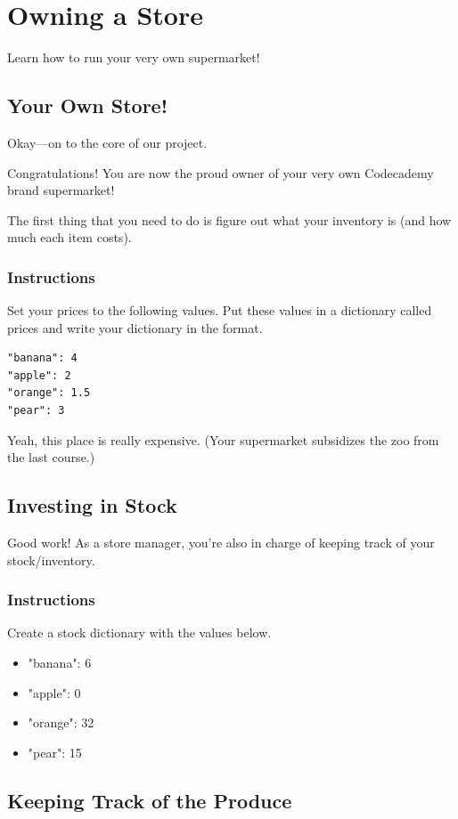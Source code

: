 \documentclass[12pt,a4paper,final,twoside,onecolumn,titlepage]{book}
\begin{document}
\section{Owning a Store}
Learn how to run your very own supermarket!
\subsection{Your Own Store!}

Okay—on to the core of our project.

Congratulations! You are now the proud owner of your very own Codecademy brand supermarket!

The first thing that you need to do is figure out what your inventory is (and how much each item costs).
\subsubsection{Instructions}
Set your prices to the following values. Put these values in a dictionary called prices and write your dictionary in the {} format.
\begin{lstlisting}
"banana": 4
"apple": 2
"orange": 1.5
"pear": 3
\end{lstlisting}
Yeah, this place is really expensive. (Your supermarket subsidizes the zoo from the last course.)

\subsection{Investing in Stock}

Good work! As a store manager, you’re also in charge of keeping track of your stock/inventory.
\subsubsection{Instructions}

Create a stock dictionary with the values below.
\begin{itemize}
\item "banana": 6
\item "apple": 0
\item "orange": 32
\item "pear": 15
\end{itemize}

\subsection{Keeping Track of the Produce}
\end{document}
